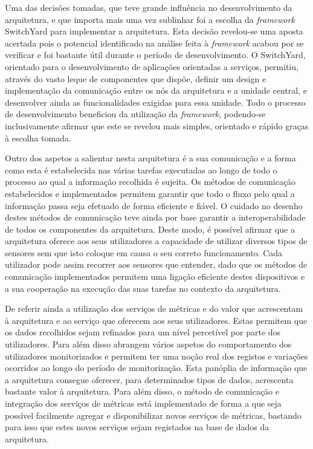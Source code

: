 Uma das decisões tomadas, que teve grande influência no desenvolvimento da arquitetura, e que importa mais uma vez sublinhar foi a escolha da \textit{framework} SwitchYard para implementar a arquitetura. Esta decisão revelou-se uma aposta acertada pois o potencial identificado na análise feita à \textit{framework} acabou por se verificar e foi bastante útil durante o período de desenvolvimento. O SwitchYard, orientado para o desenvolvimento de aplicações orientadas a serviços, permitiu, através do vasto leque de componentes que dispõe, definir um design e implementação da comunicação entre os nós da arquitetura e a unidade central, e desenvolver ainda as funcionalidades exigidas para essa unidade. Todo o processo de desenvolvimento beneficiou da utilização da \textit{framework}, podendo-se inclusivamente afirmar que este se revelou mais simples, orientado e rápido graças à escolha tomada.

Outro dos aspetos a salientar nesta arquitetura é a sua comunicação e a forma como esta é estabelecida nas várias tarefas executadas ao longo de todo o processo ao qual a informação recolhida é sujeita. Os métodos de comunicação estabelecidos e implementados permitem garantir que todo o fluxo pelo qual a informação passa seja efetuado de forma eficiente e fiável. O cuidado no desenho destes métodos de comunicação teve ainda por base garantir a interoperabilidade de todos os componentes da arquitetura. Deste modo, é possível afirmar que a arquitetura oferece aos seus utilizadores a capacidade de utilizar diversos tipos de sensores sem que isto coloque em causa o seu correto funcionamento. Cada utilizador pode assim recorrer aos sensores que entender, dado que os métodos de comunicação implementados permitem uma ligação eficiente destes dispositivos e a sua cooperação na execução das suas tarefas no contexto da arquitetura.

De referir ainda a utilização dos serviços de métricas e do valor que acrescentam à arquitetura e ao serviço que oferecem aos seus utilizadores. Estas permitem que os dados recolhidos sejam refinados para um nível percetível por parte dos utilizadores. Para além disso abrangem vários aspetos do comportamento dos utilizadores monitorizados e permitem ter uma noção real dos registos e variações ocorridos ao longo do período de monitorização. Esta panóplia de informação que a arquitetura consegue oferecer, para determinados tipos de dados, acrescenta bastante valor à arquitetura. Para além disso, o método de comunicação e integração dos serviços de métricas está implementado de forma a que seja possível facilmente agregar e disponibilizar novos serviços de métricas, bastando para isso que estes novos serviços sejam registados na base de dados da arquitetura.

